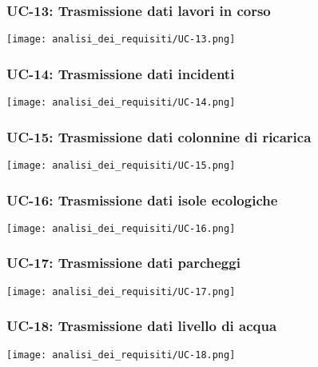 \subsubsection{UC-13: Trasmissione dati lavori in corso}
\begin{center}
	\texttt{[image: analisi\_dei\_requisiti/UC-13.png]}
\end{center}

\subsubsection{UC-14: Trasmissione dati incidenti}
\begin{center}
	\texttt{[image: analisi\_dei\_requisiti/UC-14.png]}
\end{center}

\subsubsection{UC-15: Trasmissione dati colonnine di ricarica}
\begin{center}
	\texttt{[image: analisi\_dei\_requisiti/UC-15.png]}
\end{center}

\subsubsection{UC-16: Trasmissione dati isole ecologiche}
\begin{center}
	\texttt{[image: analisi\_dei\_requisiti/UC-16.png]}
\end{center}

\subsubsection{UC-17: Trasmissione dati parcheggi}
\begin{center}
	\texttt{[image: analisi\_dei\_requisiti/UC-17.png]}
\end{center}

\subsubsection{UC-18: Trasmissione dati livello di acqua}
\begin{center}
	\texttt{[image: analisi\_dei\_requisiti/UC-18.png]}
\end{center}




